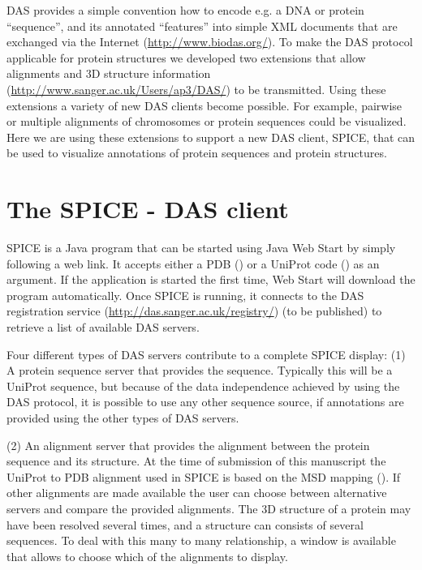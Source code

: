 \documentclass{bioinfo}
\begin{document}
DAS provides a simple convention how to encode e.g. a DNA or protein ``sequence'',
and its annotated ``features'' into simple XML documents that are exchanged via 
the Internet (\href{http://www.biodas.org/}{http://www.biodas.org/}). 
To make the DAS protocol applicable for protein structures we developed two 
extensions that allow alignments and 3D structure
information (\href{http://www.sanger.ac.uk/Users/ap3/DAS/}{http://www.sanger.ac.uk/Users/ap3/DAS/}) to be transmitted.
Using these extensions a variety of new DAS clients become possible.  For example,
pairwise or multiple alignments of chromosomes or protein sequences could be
visualized. Here we are using these extensions to support a new DAS client, SPICE,
that can be used to visualize annotations of protein sequences and protein
structures.

\section{The SPICE - DAS client}

SPICE is a Java program that can be started using Java Web Start by simply following a web
link. It accepts either a PDB (\cite{Berman.ea:2000}) or a UniProt code (\cite{uniprot:2004}) as an argument. If the application is started the first time, Web Start will download the 
program automatically. Once SPICE is running, it connects to the DAS 
registration service (\href{http://das.sanger.ac.uk/registry/}{http://das.sanger.ac.uk/registry/})
(to be published) to retrieve a list of available DAS servers. 

Four different types of DAS servers contribute to a complete SPICE display:
(1) A protein sequence server that provides the sequence. Typically this will be
a UniProt sequence, but because of the data independence achieved by using the
DAS protocol, it is  possible to use any other sequence source, if annotations
are provided using the other types of DAS servers.

(2) An alignment server that provides the alignment between the protein sequence
and its structure. At the time of submission of this manuscript the UniProt to
PDB alignment used in SPICE is based on the MSD mapping (\cite{EMSD:2003}).  If
other alignments are made available the user can choose between alternative
servers and compare the provided alignments.  The 3D structure of a
protein may have been resolved several times,  and a structure can consists of
several sequences. To deal with this many to many relationship, a window is
available that allows to choose which of the alignments to display. 
\end{document}

